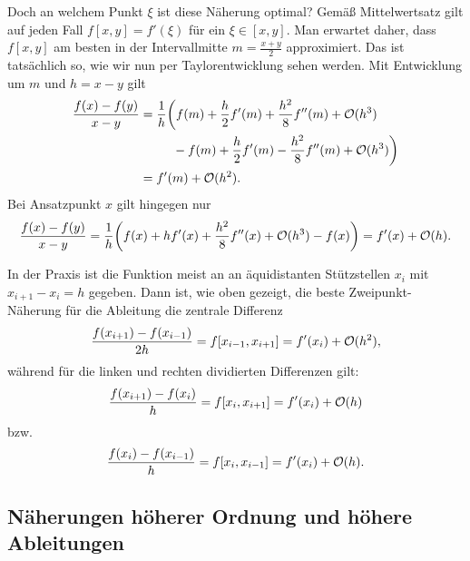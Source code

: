 Doch an welchem Punkt $\xi$ ist diese Näherung optimal? Gemäß
Mittelwertsatz gilt auf jeden Fall $f[x,y]=f'(\xi)$ für ein $\xi\in
[x,y]$. Man erwartet daher, dass $f[x,y]$ am besten in der
Intervallmitte $m=\frac{x+y}{2}$ approximiert. Das ist tatsächlich so,
wie wir nun per Taylorentwicklung sehen werden. Mit Entwicklung um $m$
und $h=x-y$ gilt
\begin{align}
  \frac{f(x) - f(y)}{x-y} &= \frac{1}{h}
  \biggl(f(m) + \frac{h}{2}f'(m) + \frac{h^2}{8}f''(m) + \O(h^3)\nonumber\\
  &\phantom{= \frac{1}{h}\biggl(}-f(m) + \frac{h}{2}f'(m) - \frac{h^2}{8}f''(m) + \O(h^3)
  \biggr)\nonumber\\
  &=  f'(m) + \O(h^2).
\end{align}
Bei Ansatzpunkt $x$ gilt hingegen nur
\begin{align}
  \frac{f(x) - f(y)}{x-y} = \frac{1}{h}
  \biggl(f(x) + h f'(x) + \frac{h^2}{8}f''(x) + \mathcal O(h^3) - f(x) \biggr)
  =  f'(x) + \mathcal O(h).
\end{align}

In der Praxis ist die Funktion meist an an äquidistanten Stützstellen
$x_i$ mit $x_{i+1}-x_i=h$ gegeben. Dann ist, wie oben gezeigt, die
beste Zweipunkt-Näherung für die Ableitung die zentrale Differenz
\begin{equation}
  \label{eq:2orderdiff}
  \frac{f(x_{i+1}) - f(x_{i-1})}{2h} = f[x_{i-1},x_{i+1}] = f'(x_i) + \mathcal O(h^2),
\end{equation}
während für die linken und rechten dividierten Differenzen gilt:
\begin{equation}
  \frac{f(x_{i+1}) - f(x_{i})}{h} = f[x_{i},x_{i+1}] = f'(x_i) + \mathcal O(h)
\end{equation}
bzw.
\begin{equation}
  \frac{f(x_{i}) - f(x_{i-1})}{h} = f[x_{i},x_{i-1}] = f'(x_i) + \mathcal O(h).
\end{equation}

\subsection{Näherungen höherer Ordnung und höhere Ableitungen}


